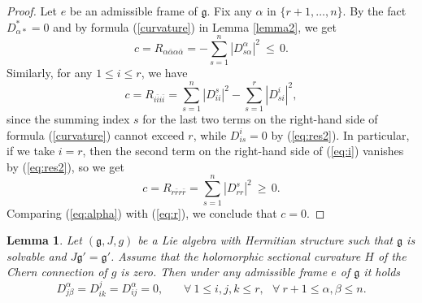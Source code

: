 \documentclass{amsart}
\newtheorem{lemma}{Lemma}
\begin{document}
\begin{proof}
Let $e$ be an admissible frame of ${\mathfrak g}$. Fix any $\alpha$ in $\{ r\!+\!1, \ldots ,n\}$. By the fact $D^{\ast}_{\alpha \ast}=0$ and by formula (\ref{curvature}) in Lemma \ref{lemma2}, we get
\begin{equation} \label{eq:alpha}
 c=R_{\alpha \bar{\alpha} \alpha \bar{\alpha} } = - \sum_{s=1}^n |D^{\alpha }_{s\alpha}|^2 \ \leq \,0. 
 \end{equation}
Similarly, for any $1\leq i\leq r$, we have
\begin{equation}  \label{eq:i}
 c=R_{i \bar{i} i \bar{i} } =  \sum_{s=1}^n |D^s_{ii}|^2 - \sum_{s=1}^r |D^{i}_{si}|^2 ,
 \end{equation}
since the summing index $s$ for the last two terms on the right-hand side of formula (\ref{curvature}) cannot exceed $r$, while $D^i_{is}=0$ by (\ref{eq:res2}). In particular, if we take $i=r$, then the second term on the right-hand side of (\ref{eq:i}) vanishes by (\ref{eq:res2}), so we get 
\begin{equation}  \label{eq:r}
 c=R_{r \bar{r} r \bar{r} } =  \sum_{s=1}^n |D^s_{rr}|^2 \ \geq \, 0. 
 \end{equation}
Comparing (\ref{eq:alpha}) with (\ref{eq:r}), we conclude that $c=0$. 
\end{proof}

\begin{lemma} \label{lemmagoal}
Let $({\mathfrak g},J,g)$ be a Lie algebra with Hermitian structure such that ${\mathfrak g}$ is solvable and  $J{\mathfrak g}'={\mathfrak g}'$. Assume that the holomorphic sectional curvature $H$ of the Chern connection of $g$ is zero. Then under any admissible frame $e$ of ${\mathfrak g}$ it holds
\begin{equation}  \label{eq:goal}
D^{\alpha}_{j\beta}=D^j_{ik}=D^{\alpha}_{ij}=0,  \ \ \ \ \ \ \ \ \forall\ 1\leq i,j,k\leq r, \ \ \ \forall \ r\!+\!1\leq \alpha , \beta \leq n. 
 \end{equation}
\end{lemma}
\end{document}
